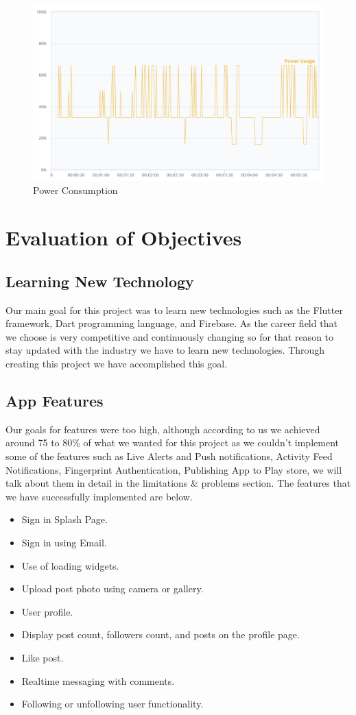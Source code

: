 \begin{figure}[H]
    \centering
    \includegraphics[scale=0.70]{testingshots/powerconsumption.PNG}
    \caption{Power Consumption}
    \label{fig:Power Consumption Test}
\end{figure}

\section{Evaluation of Objectives}
\subsection{Learning New Technology}
Our main goal for this project was to learn new technologies such as the Flutter framework, Dart programming language, and Firebase. As the career field that we choose is very competitive and continuously changing so for that reason to stay updated with the industry we have to learn new technologies. Through creating this project we have accomplished this goal.
\subsection{App Features}
Our goals for features were too high, although according to us we achieved around 75 to 80\% of what we wanted for this project as we couldn't implement some of the features such as Live Alerts and Push notifications, Activity Feed Notifications, Fingerprint Authentication, Publishing App to Play store, we will talk about them in detail in the limitations \& problems section. The features that we have successfully implemented are below.
\begin{itemize}
    \item Sign in Splash Page.
    \item Sign in using Email.
    \item Use of loading widgets.
    \item Upload post photo using camera or gallery.
    \item User profile.
    \item Display post count, followers count, and posts on the profile page.
    \item Like post.
    \item Realtime messaging with comments.
    \item Following or unfollowing user functionality.
\end{itemize}
